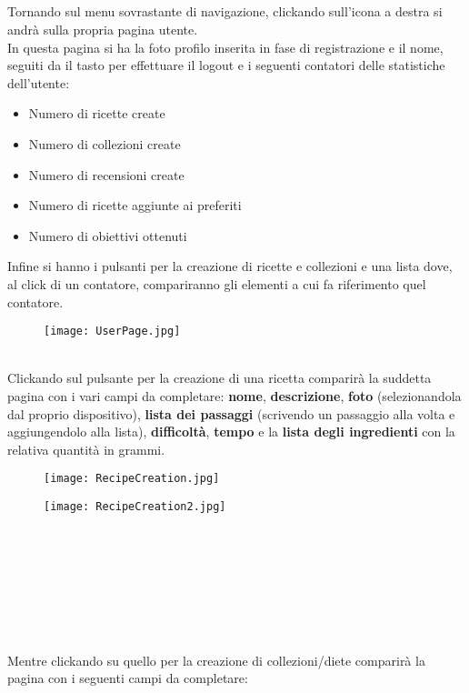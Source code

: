 ﻿\documentclass[a4paper,12pt]{report}
\begin{document}
\\\\\\\\Tornando sul menu sovrastante di navigazione, clickando sull'icona a destra si andrà sulla propria pagina utente.
\\In questa pagina si ha la foto profilo inserita in fase di registrazione e il nome, seguiti da il tasto per effettuare il logout e i seguenti contatori delle statistiche dell'utente:
\begin{itemize}
    \item Numero di ricette create
    \item Numero di collezioni create
    \item Numero di recensioni create
    \item Numero di ricette aggiunte ai preferiti
    \item Numero di obiettivi ottenuti
\end{itemize}
Infine si hanno i pulsanti per la creazione di ricette e collezioni e una lista dove, al click di un contatore, compariranno gli elementi a cui fa riferimento quel contatore.
\begin{figure}[h!]
    \centering
    \texttt{[image: UserPage.jpg]}
\end{figure}
\\Clickando sul pulsante per la creazione di una ricetta comparirà la suddetta pagina con i vari campi da completare: 
\textbf{nome}, \textbf{descrizione}, \textbf{foto} (selezionandola dal proprio dispositivo), \textbf{lista dei passaggi} (scrivendo un passaggio alla volta e aggiungendolo alla lista), \textbf{difficoltà}, \textbf{tempo} e la \textbf{lista degli ingredienti} con la relativa quantità in grammi.\\
\begin{figure}[h!]
    \begin{minipage}{.5\textwidth}
        \centering
        \texttt{[image: RecipeCreation.jpg]}
    \end{minipage}
    \begin{minipage}{.5\textwidth}
        \centering
        \texttt{[image: RecipeCreation2.jpg]}
    \end{minipage}
\end{figure}
\\\\\\\\\\\\\\Mentre clickando su quello per la creazione di collezioni/diete comparirà la pagina con i seguenti campi da completare:
\end{document}
